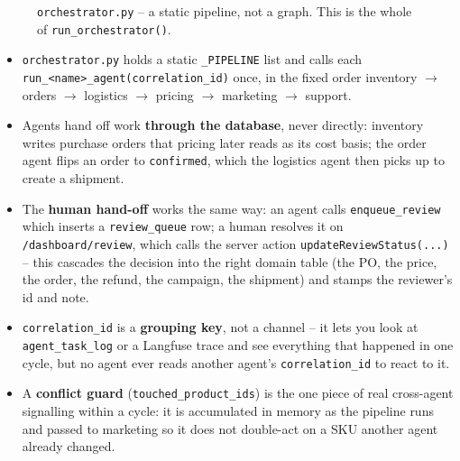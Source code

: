 \documentclass[11pt,a4paper]{article}
\begin{document}
\begin{figure}[h]
\centering
{}
\caption{\texttt{orchestrator.py} -- a static pipeline, not a graph. This is the whole of \texttt{run\_orchestrator()}.}
\end{figure}

\begin{itemize}[itemsep=2pt]
  \item \texttt{orchestrator.py} holds a static \texttt{\_PIPELINE} list and calls each
  \texttt{run\_<name>\_agent(correlation\_id)} once, in the fixed order inventory $\to$ orders
  $\to$ logistics $\to$ pricing $\to$ marketing $\to$ support.
  \item Agents hand off work \textbf{through the database}, never directly: inventory writes
  purchase orders that pricing later reads as its cost basis; the order agent flips an order
  to \texttt{confirmed}, which the logistics agent then picks up to create a shipment.
  \item The \textbf{human hand-off} works the same way: an agent calls \texttt{enqueue\_review}
  which inserts a \texttt{review\_queue} row; a human resolves it on \texttt{/dashboard/review},
  which calls the server action \texttt{updateReviewStatus(...)} -- this cascades the decision
  into the right domain table (the PO, the price, the order, the refund, the campaign, the
  shipment) and stamps the reviewer's id and note.
  \item \texttt{correlation\_id} is a \textbf{grouping key}, not a channel -- it lets you look
  at \texttt{agent\_task\_log} or a Langfuse trace and see everything that happened in one
  cycle, but no agent ever reads another agent's \texttt{correlation\_id} to react to it.
  \item A \textbf{conflict guard} (\texttt{touched\_product\_ids}) is the one piece of real
  cross-agent signalling within a cycle: it is accumulated in memory as the pipeline runs and
  passed to marketing so it does not double-act on a SKU another agent already changed.
\end{itemize}
\end{document}
